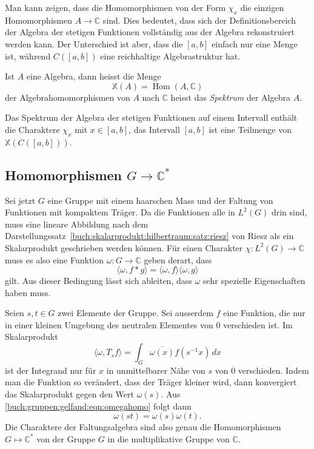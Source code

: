 Man kann zeigen, dass die Homomorphismen von der Form $\chi_x$ 
die einzigen Homomorphismen $A\to\mathbb{C}$ sind.
Dies bedeutet, dass sich der Definitionsbereich der Algebra der
stetigen Funktionen vollständig aus der Algebra rekonstruiert werden 
kann.
Der Unterschied ist aber, dass die $[a,b]$ einfach nur eine Menge ist,
während $C([a,b])$ eine reichhaltige Algebrastruktur hat.

\begin{definition}
\label{buch:gruppen:gelfand:def:spektrum}
Ist $A$ eine Algebra, dann heisst die Menge
\[
\mathbb{X}(A)
=
\operatorname{Hom}(A,\mathbb{C})
\]
der Algebrahomomorphismen von $A$ nach $\mathbb{C}$ heisst das
{\em Spektrum} der Algebra $A$.
\end{definition}

Das Spektrum der Algebra der stetigen Funktionen auf einem Intervall
enthält die Charaktere $\chi_x$ mit $x\in [a,b]$, das Intervall
$[a,b]$ ist eine Teilmenge von $\mathbb{X}(C([a,b]))$.

%
%
\subsection{Homomorphismen $G\to \mathbb{C}^*$}
Sei jetzt $G$ eine Gruppe mit einem haarschen Mass und der Faltung 
von Funktionen mit kompaktem Träger.
Da die Funktionen alle in $L^2(G)$ drin sind, muss eine lineare
Abbildung nach dem
Darstellungssatz~\ref{buch:skalarprodukt:hilbertraum:satz:riesz}
von Riesz als ein Skalarprodukt geschrieben werden können.
Für einen Charakter $\chi\colon L^2(G)\to\mathbb{C}$ muss es also eine
Funktion $\omega\colon G\to\mathbb{C}$ geben derart, dass
\begin{equation}
\langle \omega, f*g\rangle
=
\langle \omega, f\rangle
\langle \omega, g\rangle
\label{buch:gruppen:gelfand:eqn:omegahomo}
\end{equation}
gilt.
Aus dieser Bedingung lässt sich ableiten, dass $\omega$ sehr spezielle
Eigenschaften haben muss.

Seien $s,t\in G$ zwei Elemente der Gruppe.
Sei ausserdem $f$ eine Funktion, die nur in einer kleinen Umgebung 
des neutralen Elementes von $0$ verschieden ist.
Im Skalarprodukt
\[
\langle \omega, T_{s}f\rangle
=
\int_{G} \overline{\omega(x)} f(s^{-1}x) \,dx
\]
ist der Integrand nur für $x$ in unmittelbarer Nähe von $s$  von
$0$ verschieden.
Indem man die Funktion so verändert, dass der Träger kleiner wird,
dann konvergiert das Skalarprodukt gegen den Wert $\omega(s)$.
Aus \eqref{buch:gruppen:gelfand:eqn:omegahomo} folgt dann
\[
\omega(st) = \omega(s)\omega(t).
\]
Die Charaktere der Faltungsalgebra sind also genau die Homomorphismen
$G\mapsto\mathbb{C}^*$ von der Gruppe $G$ in die multiplikative
Gruppe von $\mathbb{C}$.

